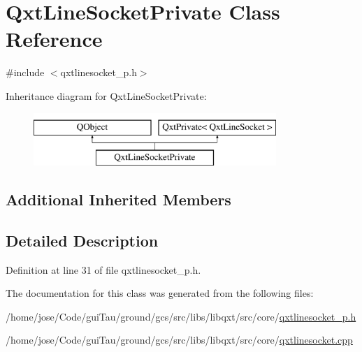 \hypertarget{class_qxt_line_socket_private}{\section{Qxt\-Line\-Socket\-Private Class Reference}
\label{class_qxt_line_socket_private}
}


{\ttfamily \#include $<$qxtlinesocket\-\_\-p.\-h$>$}

Inheritance diagram for Qxt\-Line\-Socket\-Private\-:\begin{figure}[H]
\begin{center}
\leavevmode
\includegraphics[height=2.000000cm]{class_qxt_line_socket_private}
\end{center}
\end{figure}
\subsection*{Additional Inherited Members}


\subsection{Detailed Description}


Definition at line 31 of file qxtlinesocket\-\_\-p.\-h.



The documentation for this class was generated from the following files\-:\begin{DoxyCompactItemize}
\item 
/home/jose/\-Code/gui\-Tau/ground/gcs/src/libs/libqxt/src/core/\hyperlink{qxtlinesocket__p_8h}{qxtlinesocket\-\_\-p.\-h}\item 
/home/jose/\-Code/gui\-Tau/ground/gcs/src/libs/libqxt/src/core/\hyperlink{qxtlinesocket_8cpp}{qxtlinesocket.\-cpp}\end{DoxyCompactItemize}
